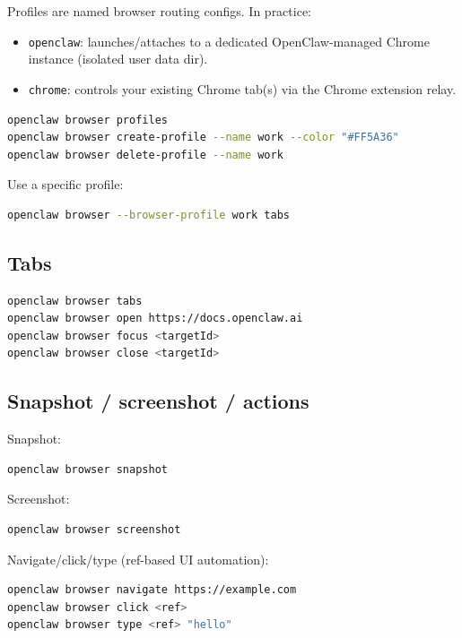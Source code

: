 Profiles are named browser routing configs. In practice:

\begin{itemize}
  \item \texttt{openclaw}: launches/attaches to a dedicated OpenClaw-managed Chrome instance (isolated user data dir).
  \item \texttt{chrome}: controls your existing Chrome tab(s) via the Chrome extension relay.
\end{itemize}


\begin{lstlisting}[language=bash]
openclaw browser profiles
openclaw browser create-profile --name work --color "#FF5A36"
openclaw browser delete-profile --name work
\end{lstlisting}


Use a specific profile:

\begin{lstlisting}[language=bash]
openclaw browser --browser-profile work tabs
\end{lstlisting}


\subsection{Tabs}


\begin{lstlisting}[language=bash]
openclaw browser tabs
openclaw browser open https://docs.openclaw.ai
openclaw browser focus <targetId>
openclaw browser close <targetId>
\end{lstlisting}


\subsection{Snapshot / screenshot / actions}


Snapshot:

\begin{lstlisting}[language=bash]
openclaw browser snapshot
\end{lstlisting}


Screenshot:

\begin{lstlisting}[language=bash]
openclaw browser screenshot
\end{lstlisting}


Navigate/click/type (ref-based UI automation):

\begin{lstlisting}[language=bash]
openclaw browser navigate https://example.com
openclaw browser click <ref>
openclaw browser type <ref> "hello"
\end{lstlisting}


